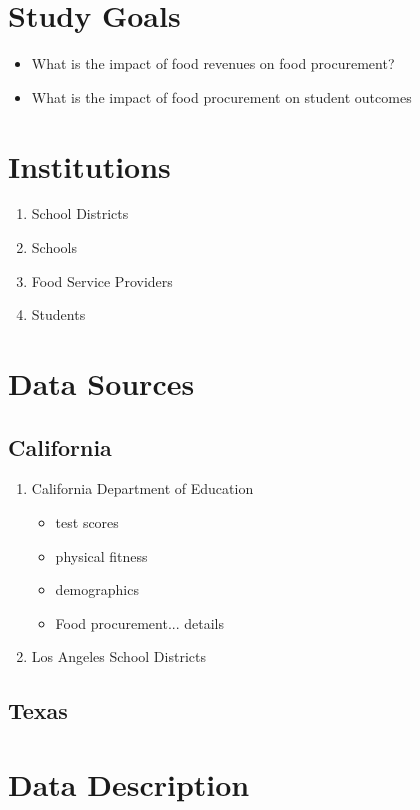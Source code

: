 \documentclass[12pt]{article}
\begin{document}
\section{Study Goals}

\begin{itemize}
	\item What is the impact of food revenues on food procurement?
	\item What is the impact of food procurement on student outcomes
\end{itemize}

\section{Institutions}
\begin{enumerate}
	\item School Districts
	\item Schools
	\item Food Service Providers
	\item Students
\end{enumerate} 

\section{Data Sources}

\subsection{California}

\begin{enumerate}
	\item California Department of Education
	\begin{itemize}
		\item test scores
		\item physical fitness
		\item demographics
		\item Food procurement... details
	\end{itemize}
	\item Los Angeles School Districts
	\end{enumerate}

\subsection{Texas}

\section{Data Description}
\end{document}
